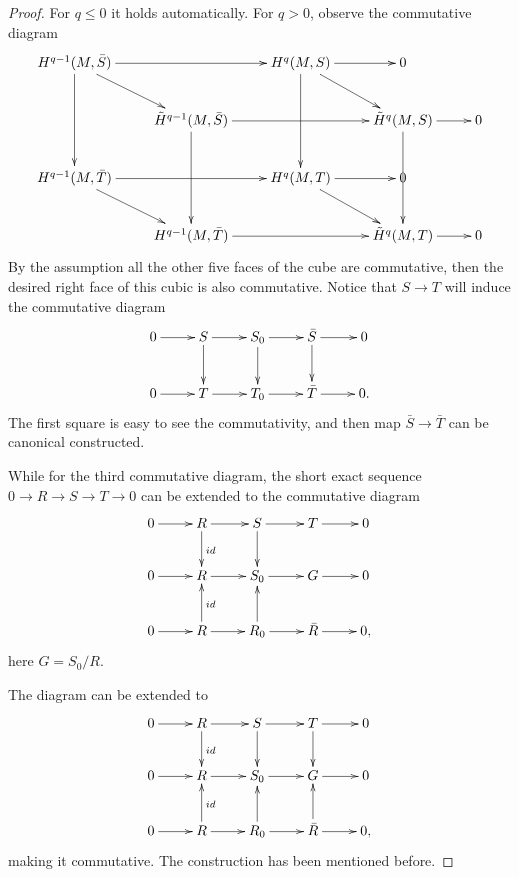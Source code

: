 \documentclass[twoside]{article}
\begin{document}
\begin{proof}
  For $q\leq 0$ it holds automatically. For $q>0$, observe the  commutative diagram \begin{equation*}
    \xymatrix{
     H^{q-1}(M,\bar{S}) \ar[dd]\ar[rr] \ar[dr]  &          &   H^q(M,S) \ar[dd]\ar[dr]\ar[r]     &        0 &          \\
         & \tilde{H}^{q-1}(M,\bar{S}) \ar[dd] \ar[rr]       &         &     \tilde{H}^q(M,S) \ar[dd]\ar[r]   &  0        \\
        H^{q-1}(M,\bar{T})\ar[rr]\ar[dr] &          & H^q(M,T)  \ar[r]\ar[dr]      &      0   &          \\
         & H^{q-1}(M,\bar{T})     \ar[rr]    &         & \tilde{H}^q(M,T) \ar[r]       &   0       \\
    }
  \end{equation*}
By the assumption all the other five faces of the cube are commutative, then  the desired right face of this cubic is also commutative. Notice that  $S\to T$ will induce the   commutative diagram
\begin{equation*}
  \xymatrix{
  0\ar[r]&S\ar[r]\ar[d]&S_0\ar[r]\ar[d]&\bar{S}\ar[d]\ar[r]&0\\
  0\ar[r]&T\ar[r]&T_0\ar[r]&\bar{T}\ar[r]&0.\\
  }
\end{equation*}
The first square is easy to see the commutativity, and  then map $\bar{S}\to \bar{T}$ can be canonical constructed.


While for the third commutative diagram, the short exact sequence $0\to R \to S\to T\to 0$ can be extended to   the commutative diagram
\begin{equation*}\xymatrix{
  0\ar[r]&R\ar[r]\ar[d]^{id}&S\ar[r]\ar[d]&T\ar[r]&0\\
  0\ar[r]&R\ar[r]&S_0\ar[r]&G\ar[r]&0\\
  0\ar[r]&R\ar[r]\ar[u]_{id}&R_0\ar[u]\ar[r]&\bar{R}\ar[r]&0,\\}
\end{equation*}
here $G=S_0/R$.

The diagram can be  extended  to \begin{equation*}\xymatrix{
  0\ar[r]&R\ar[r]\ar[d]^{id}&S\ar[r]\ar[d]&T\ar[d]\ar[r]&0\\
  0\ar[r]&R\ar[r]&S_0\ar[r]&G\ar[r]&0\\
  0\ar[r]&R\ar[r]\ar[u]_{id}&R_0\ar[u]\ar[r]&\bar{R}\ar[u]\ar[r]&0,\\}
\end{equation*}
making it commutative. The construction has been mentioned before.


\end{proof}
\end{document}
